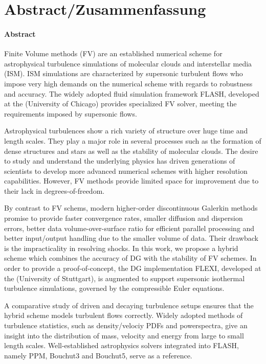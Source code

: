 \section*{Abstract/Zusammenfassung}
\paragraph{Abstract}
Finite Volume methods (FV) are an established numerical scheme for
astrophysical turbulence simulations of molecular clouds and interstellar media
(ISM). ISM simulations are characterized by supersonic turbulent flows who 
impose very high demands on the numerical scheme with regards to robustness and
accuracy. The widely adopted fluid simulation framework FLASH, developed at the
 (University of Chicago) provides
specialized FV solver, meeting the requirements imposed by supersonic flows.

Astrophysical turbulences show a rich variety of structure over huge time and
length scales. They play a major role in several processes such as the
formation of dense structures and stars as well as the stability of molecular
clouds. The desire to study and understand the underlying physics has driven
generations of scientists to develop more advanced numerical schemes with
higher resolution capabilities. However, FV methods provide limited space for
improvement due to their lack in degrees-of-freedom.

By contrast to FV schems, modern higher-order discontinuous Galerkin methods
promise to provide faster convergence rates, smaller diffusion and dispersion
errors, better data volume-over-surface ratio for efficient parallel processing
and better input/output handling due to the smaller volume of data. Their
drawback is the impracticality in resolving shocks. In this work, we propose a
hybrid scheme which combines the accuracy of DG with the stability of FV
schemes. In order to provide a proof-of-concept, the DG implementation FLEXI,
developed at the  (University
of Stuttgart), is augmented to support supersonic isothermal turbulence
simulations, governed by the compressible Euler equations.

A comparative study of driven and decaying turbulence setups ensures that the
hybrid scheme models turbulent flows correctly. Widely adopted methods of
turbulence statistics, such as density/velociy PDFs and powerspectra, give an
insight into the distribution of mass, velocity and energy from large to small
length scales. Well-established astrophysics solvers integrated into FLASH,
namely PPM, Bouchut3 and Bouchut5, serve as a reference.

